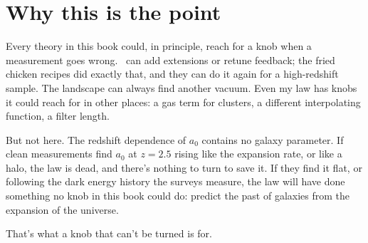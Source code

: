 \section{Why this is the point}

Every theory in this book could, in principle, reach for a knob when a measurement goes wrong. \LCDM\ can add extensions or retune feedback; the fried chicken recipes did exactly that, and they can do it again for a high-redshift sample. The landscape can always find another vacuum. Even my law has knobs it could reach for in other places: a gas term for clusters, a different interpolating function, a filter length.

But not here. The redshift dependence of $a_0$ contains no galaxy parameter. If clean measurements find $a_0$ at $z=2.5$ rising like the expansion rate, or like a halo, the law is dead, and there's nothing to turn to save it. If they find it flat, or following the dark energy history the surveys measure, the law will have done something no knob in this book could do: predict the past of galaxies from the expansion of the universe.

That's what a knob that can't be turned is for.
